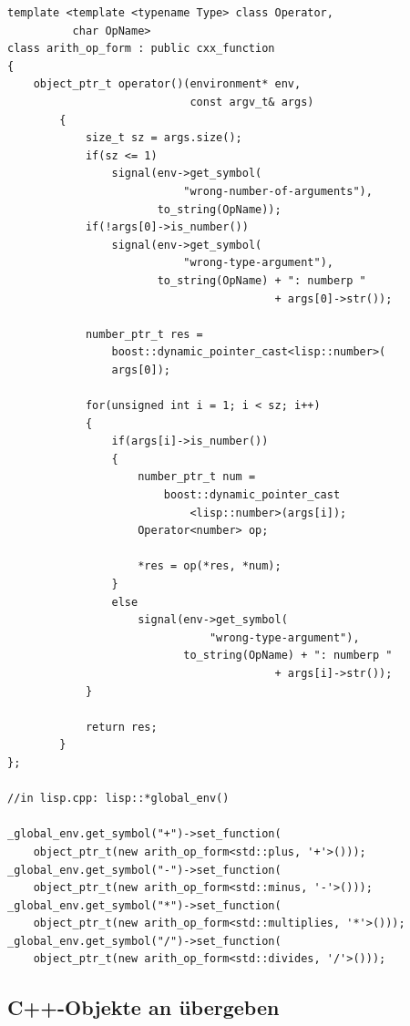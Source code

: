 \begin{lstlisting}[caption={Arithmetische Operatoren an Lisp übergeben}, label=lst:cxx_function]
template <template <typename Type> class Operator,
          char OpName>
class arith_op_form : public cxx_function
{
    object_ptr_t operator()(environment* env,
                            const argv_t& args)
        {
            size_t sz = args.size();
            if(sz <= 1)
                signal(env->get_symbol(
                           "wrong-number-of-arguments"),
                       to_string(OpName));
            if(!args[0]->is_number())
                signal(env->get_symbol(
                           "wrong-type-argument"),
                       to_string(OpName) + ": numberp "
                                         + args[0]->str());

            number_ptr_t res = 
                boost::dynamic_pointer_cast<lisp::number>(
                args[0]);

            for(unsigned int i = 1; i < sz; i++)
            {
                if(args[i]->is_number())
                {
                    number_ptr_t num =
                        boost::dynamic_pointer_cast
                            <lisp::number>(args[i]);
                    Operator<number> op;

                    *res = op(*res, *num);
                }
                else
                    signal(env->get_symbol(
                               "wrong-type-argument"),
                           to_string(OpName) + ": numberp "
                                         + args[i]->str());
            }

            return res;
        }
};

//in lisp.cpp: lisp::*global_env()

_global_env.get_symbol("+")->set_function(
    object_ptr_t(new arith_op_form<std::plus, '+'>()));
_global_env.get_symbol("-")->set_function(
    object_ptr_t(new arith_op_form<std::minus, '-'>()));
_global_env.get_symbol("*")->set_function(
    object_ptr_t(new arith_op_form<std::multiplies, '*'>()));
_global_env.get_symbol("/")->set_function(
    object_ptr_t(new arith_op_form<std::divides, '/'>()));
\end{lstlisting}

\subsection{C++-Objekte an \projectname{} übergeben}
\label{sec:cxx_object_interface}

